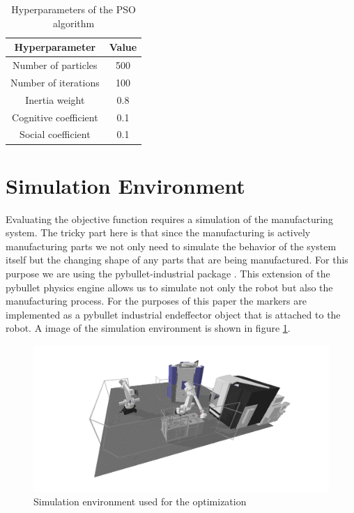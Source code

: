 \documentclass{svproc}
\begin{document}
\begin{table}  %
        \centering
        \begin{tabular}{c|c}
                Hyperparameter & Value \\
                \hline
                Number of particles & 500 \\
                Number of iterations & 100 \\
                Inertia weight & 0.8 \\
                Cognitive coefficient & 0.1 \\
                Social coefficient & 0.1 \\
        \end{tabular}
        \caption{Hyperparameters of the PSO algorithm}
        \label{tab:hyperparameters}
\end{table}

\section{Simulation Environment}
Evaluating the objective function requires a simulation of the manufacturing system.
The tricky part here is that since the manufacturing is actively manufacturing parts we not only need to simulate the behavior of the system itself but the changing shape of any parts that are being manufactured.
For this purpose we are using the pybullet-industrial package \cite{pybullet_industrial}.
This extension of the pybullet physics engine allows us to simulate not only the robot but also the manufacturing process.
For the purposes of this paper the markers are implemented as a pybullet industrial endeffector object that is attached to the robot.
A image of the simulation environment is shown in figure \ref{fig:simulation}.
\begin{figure}
        \centering
        \includegraphics[width=\textwidth]{figures/simulation.png}
        \caption{Simulation environment used for the optimization}
        \label{fig:simulation}
\end{figure}
\end{document}
